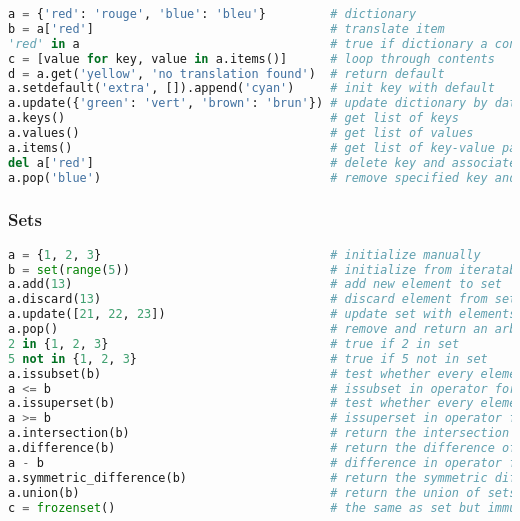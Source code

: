 \documentclass[]{article}
\begin{document}
\begin{lstlisting}[language=Python]
a = {'red': 'rouge', 'blue': 'bleu'}         # dictionary
b = a['red']                                 # translate item
'red' in a                                   # true if dictionary a contains key 'red'
c = [value for key, value in a.items()]      # loop through contents
d = a.get('yellow', 'no translation found')  # return default
a.setdefault('extra', []).append('cyan')     # init key with default
a.update({'green': 'vert', 'brown': 'brun'}) # update dictionary by data from another one
a.keys()                                     # get list of keys
a.values()                                   # get list of values
a.items()                                    # get list of key-value pairs
del a['red']                                 # delete key and associated with it value
a.pop('blue')                                # remove specified key and return the corresponding value
\end{lstlisting}

\subsubsection{Sets}\label{sets}

\begin{lstlisting}[language=Python]
a = {1, 2, 3}                                # initialize manually
b = set(range(5))                            # initialize from iteratable
a.add(13)                                    # add new element to set
a.discard(13)                                # discard element from set
a.update([21, 22, 23])                       # update set with elements from iterable
a.pop()                                      # remove and return an arbitrary set element
2 in {1, 2, 3}                               # true if 2 in set
5 not in {1, 2, 3}                           # true if 5 not in set
a.issubset(b)                                # test whether every element in a is in b
a <= b                                       # issubset in operator form
a.issuperset(b)                              # test whether every element in b is in a
a >= b                                       # issuperset in operator form
a.intersection(b)                            # return the intersection of two sets as a new set
a.difference(b)                              # return the difference of two or more sets as a new set
a - b                                        # difference in operator form
a.symmetric_difference(b)                    # return the symmetric difference of two sets as a new set
a.union(b)                                   # return the union of sets as a new set
c = frozenset()                              # the same as set but immutable
\end{lstlisting}
\end{document}
